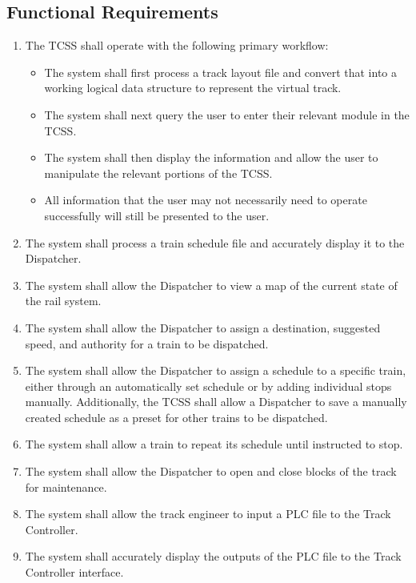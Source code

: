 \documentclass{article}
\begin{document}
    \subsection{Functional Requirements}
    \begin{enumerate}
    \item The TCSS shall operate with the following primary workflow:
        \begin{itemize}
            \item The system shall first process a track layout file and convert that into a working logical data structure to represent the virtual track.
            \item The system shall next query the user to enter their relevant module in the TCSS.
            \item The system shall then display the information and allow the user to manipulate the relevant portions of the TCSS.
            \item All information that the user may not necessarily need to operate successfully will still be presented to the user. 
        \end{itemize}
        \item The system shall process a train schedule file and accurately display it to the Dispatcher.
        \item The system shall allow the Dispatcher  to view a map of the current state of the rail system.
        \item The system shall allow the Dispatcher  to assign a destination, suggested speed, and authority for a train to be dispatched.
        \item The system shall allow the Dispatcher  to assign a schedule to a specific train, either through an automatically set schedule or by adding individual stops manually. Additionally, the TCSS shall allow a Dispatcher  to save a manually created schedule as a preset for other trains to be dispatched.
        \item The system shall allow a train to repeat its schedule until instructed to stop.
        \item The system shall allow the Dispatcher  to open and close blocks of the track for maintenance.
        
        \item The system shall allow the track engineer to input a PLC  file to the Track Controller. 
        \item The system shall accurately display the outputs of the PLC  file to the Track Controller  interface.
        


\end{enumerate}
\end{document}

